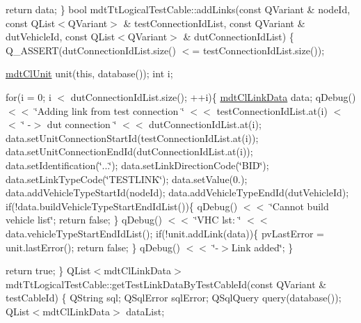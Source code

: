 return data; \} bool mdt\-Tt\-Logical\-Test\-Cable\-::add\-Links(const Q\-Variant \& node\-Id, const Q\-List$<$\-Q\-Variant$>$ \& test\-Connection\-Id\-List, const Q\-Variant \& dut\-Vehicle\-Id, const Q\-List$<$\-Q\-Variant$>$ \& dut\-Connection\-Id\-List) \{ Q\-\_\-\-A\-S\-S\-E\-R\-T(dut\-Connection\-Id\-List.\-size() $<$= test\-Connection\-Id\-List.\-size());

\hyperlink{classmdt_cl_unit}{mdt\-Cl\-Unit} unit(this, database()); int i;

for(i = 0; i $<$ dut\-Connection\-Id\-List.\-size(); ++i)\{ \hyperlink{classmdt_cl_link_data}{mdt\-Cl\-Link\-Data} data; q\-Debug() $<$$<$ \char`\"{}\-Adding link from test connection \char`\"{} $<$$<$ test\-Connection\-Id\-List.\-at(i) $<$$<$ \char`\"{} -\/$>$ dut connection \char`\"{} $<$$<$ dut\-Connection\-Id\-List.\-at(i); data.\-set\-Unit\-Connection\-Start\-Id(test\-Connection\-Id\-List.\-at(i)); data.\-set\-Unit\-Connection\-End\-Id(dut\-Connection\-Id\-List.\-at(i)); data.\-set\-Identification(\char`\"{}...\char`\"{}); data.\-set\-Link\-Direction\-Code(\char`\"{}\-B\-I\-D\char`\"{}); data.\-set\-Link\-Type\-Code(\char`\"{}\-T\-E\-S\-T\-L\-I\-N\-K\char`\"{}); data.\-set\-Value(0.); data.\-add\-Vehicle\-Type\-Start\-Id(node\-Id); data.\-add\-Vehicle\-Type\-End\-Id(dut\-Vehicle\-Id); if(!data.build\-Vehicle\-Type\-Start\-End\-Id\-List())\{ q\-Debug() $<$$<$ \char`\"{}\-Cannot build vehicle list\char`\"{}; return false; \} q\-Debug() $<$$<$ \char`\"{}\-V\-H\-C lst\-: \char`\"{} $<$$<$ data.\-vehicle\-Type\-Start\-End\-Id\-List(); if(!unit.add\-Link(data))\{ pv\-Last\-Error = unit.\-last\-Error(); return false; \} q\-Debug() $<$$<$ \char`\"{}-\/$>$\-Link added\char`\"{}; \}

return true; \} Q\-List$<$mdt\-Cl\-Link\-Data$>$ mdt\-Tt\-Logical\-Test\-Cable\-::get\-Test\-Link\-Data\-By\-Test\-Cable\-Id(const Q\-Variant \& test\-Cable\-Id) \{ Q\-String sql; Q\-Sql\-Error sql\-Error; Q\-Sql\-Query query(database()); Q\-List$<$mdt\-Cl\-Link\-Data$>$ data\-List;

